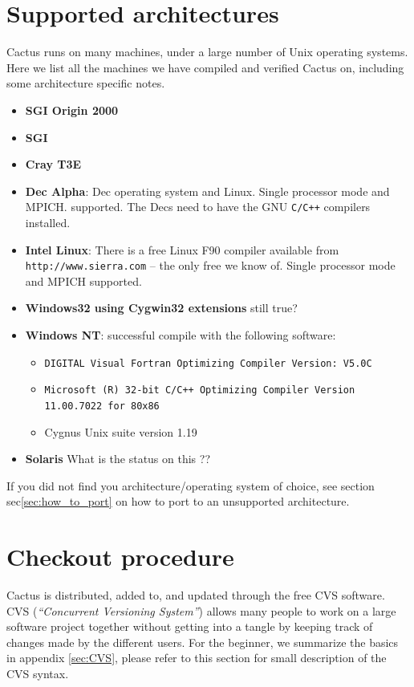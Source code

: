 \section{Supported architectures}
Cactus runs on many machines, under a large number of Unix operating
systems. Here we list all the machines we have compiled and verified
Cactus on, including some architecture specific notes. 
\begin{itemize} 
\item{\bf SGI Origin 2000}
\item{\bf SGI}
\item{\bf Cray T3E}
\item{\bf Dec Alpha}: Dec operating system and Linux. Single processor
  mode and MPICH.
  supported. The Decs need to have the GNU {\tt C/C++} compilers installed.
\item{\bf Intel Linux}: There is a
  free Linux F90 compiler available from  {\tt http://www.sierra.com}
  -- the only free we know of. Single processor mode and MPICH
  supported.
\item{\bf Windows32 using Cygwin32 extensions} {\q still true?}
\item{\bf Windows NT}: successful compile with the following software:
  \begin{itemize}
  \item{\tt DIGITAL Visual Fortran Optimizing Compiler Version: V5.0C}
  \item{\tt Microsoft (R) 32-bit C/C++ Optimizing Compiler Version
        11.00.7022 for 80x86}
  \item{Cygnus Unix suite version 1.19}
  \end{itemize}
\item{\bf Solaris } {\q What is the status on this ??}
\end{itemize}
If you did not find you architecture/operating system of
choice, see section sec\ref{sec:how_to_port} on how to port to an
unsupported architecture.


\section{Checkout procedure}

Cactus is distributed, added to, and updated through the free CVS
software. CVS ({\em ``Concurrent Versioning System''}) allows many
people to work on a large software project together without getting
into a tangle by keeping track of changes made by the different
users. For the beginner, we summarize the basics in appendix
\ref{sec:CVS}, please refer to this section for small description of
the CVS syntax.

